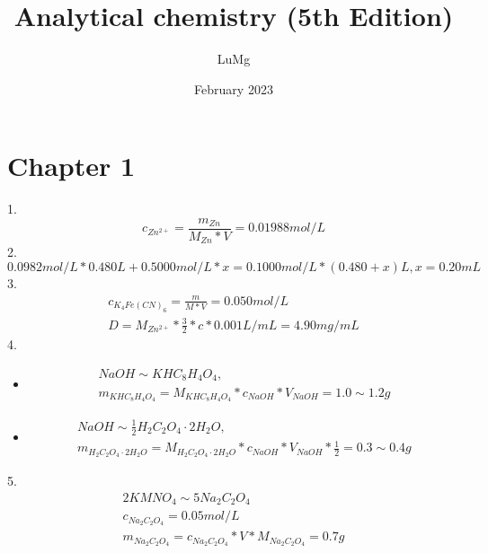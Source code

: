 \documentclass{article}
\title{Analytical chemistry (5th Edition)}
\author{LuMg}
\date{February 2023}
\begin{document}
\maketitle

\section{Chapter 1}
1.
\begin{equation}
    c_{Zn^{2+}} = \frac{m_{Zn}}{M_{Zn} * V} = 0.01988mol/L
\end{equation}
2.
\begin{equation}
    0.0982mol/L * 0.480L + 0.5000 mol/L * x = 0.1000 mol/L * (0.480 + x)L, x = 0.20mL
\end{equation}
3. 
\begin{equation}
    \begin{multlined}
    c_{K_{4}Fe(CN)_{6}} = \frac{m}{M * V} = 0.050 mol/L\\
    D = M_{Zn^{2+}} * \frac{3}{2} * c * 0.001 L/mL = 4.90 mg/mL
    \end{multlined}
\end{equation}
4.\begin{itemize}
    \item 
    \begin{equation}
    \begin{multlined}
        NaOH \sim KHC_{8}H_{4}O_{4},\\
        m_{KHC_{8}H_{4}O_{4}} = M_{KHC_{8}H_{4}O_{4}}*c_{NaOH}*V_{NaOH} = 1.0\sim1.2g
        \end{multlined}
    \end{equation}
    \item
    \begin{equation}
    \begin{multlined}
        NaOH\sim\frac{1}{2}H_2C_2O_4\cdot2H_2O,\\
        m_{H_2C_2O_4\cdot2H_2O} = M_{H_2C_2O_4\cdot2H_2O}*c_{NaOH}*V_{NaOH}*\frac{1}{2} = 0.3\sim0.4g
    \end{multlined}
    \end{equation}
\end{itemize}
5.\begin{equation}
    \begin{multlined}
        2KMNO_4\sim5Na_2C_2O_4\\
        c_{Na_2C_2O_4} = 0.05 mol/L\\
        m_{Na_2C_2O_4} = c_{Na_2C_2O_4} * V * M_{Na_2C_2O_4} = 0.7g
    \end{multlined}
\end{equation}
\end{document}
